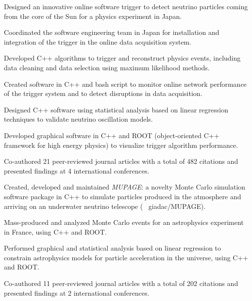 \documentclass[letterpaper]{deedy-resume} %
\begin{document}
\begin{minipage}[t]{0.66\textwidth}
\begin{tightitemize}
\item Designed an innovative online software trigger to detect neutrino particles coming from the core of the Sun for a physics experiment in Japan.
\item Coordinated the software engineering team in Japan for installation and integration of the trigger in the online data acquisition system.
\item Developed C++ algorithms to trigger and reconstruct physics events, including data cleaning and data selection using maximum likelihood methods.
\item Created software in C++ and bash script to monitor online network performance of the trigger system and to detect disruptions in data acquisition.
\item Designed C++ software using statistical analysis based on linear regression techniques to validate neutrino oscillation models.
\item Developed graphical software in C++ and ROOT (object-oriented C++ framework for high energy physics) to visualize trigger algorithm performance. 
\item Co-authored 21 peer-reviewed journal articles with a total of 482 citations and presented findings at 4 international conferences. 
\end{tightitemize}

\sectionspace %



\begin{tightitemize}
\item Created, developed and maintained \textit{MUPAGE}: a novelty Monte Carlo simulation software package in C++ to simulate particles produced in the atmosphere and arriving on an underwater neutrino telescope (\faGithub ~ giadac/MUPAGE).
\item Mass-produced and analyzed Monte Carlo events for an astrophysics experiment in France, using C++ and ROOT. 
\item Performed graphical and statistical analysis based on linear regression to constrain astrophysics models for particle acceleration in the universe, using C++ and ROOT.
\item Co-authored 11 peer-reviewed journal articles with a total of 202 citations and presented findings at 2 international conferences.
\end{tightitemize}


\end{minipage}
\end{document}
